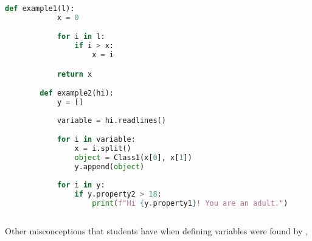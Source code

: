 \begin{description}
\begin{lstlisting}[language=Python]
        def example1(l):
            x = 0

            for i in l:
                if i > x:
                    x = i

            return x

        def example2(hi):
            y = []
            
            variable = hi.readlines()

            for i in variable:
                x = i.split()
                object = Class1(x[0], x[1])
                y.append(object)
                
            for i in y:
                if y.property2 > 18:
                    print(f"Hi {y.property1}! You are an adult.")
            
    \end{lstlisting}

    
\end{description}


Other misconceptions that students have when defining variables were found 
by \textcite{GuoMarkelZhang2020},

